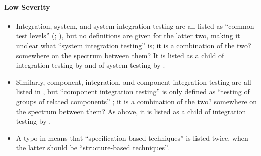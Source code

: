       \paragraph{Low Severity}
      \begin{itemize}
            \item %
                  Integration, system, and system integration testing are all listed
                  as ``common test levels'' (\citealp[p.~12]{IEEE2022};
                  \citeyear[p.~6]{IEEE2021}), but no
                  definitions are given for the latter two, making it unclear what
                  ``system integration testing'' is; it is a combination of the two?
                  somewhere on the spectrum between them? It is listed as a child
                  of integration testing by \citetISTQB{} and of system testing
                  by \citet[p.~23]{Firesmith2015}.
            \item %
                  Similarly, component, integration, and component integration
                  testing are all listed in \citep{IEEE2017}, but ``component
                  integration testing'' is only defined as ``testing of groups of
                  related components'' \citep[p.~82]{IEEE2017}; it is a combination of
                  the two? somewhere on the spectrum between them? As above, it is
                  listed as a child of integration testing by \citetISTQB{}.
            \item %
                  A typo in \citep[Fig.~2]{IEEE2021} means that ``specification-based
                  techniques'' is listed twice, when the latter should be
                  ``structure-based techniques''.
      \end{itemize}\fi